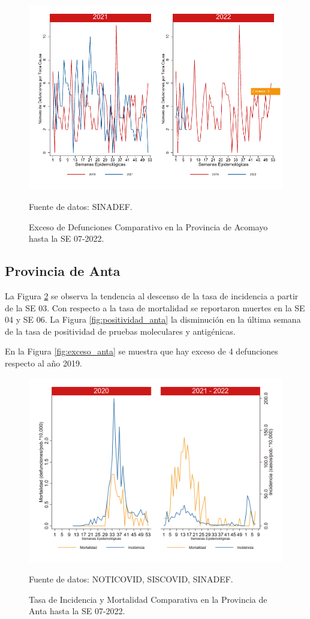 \documentclass[12pt,a4paper,openany]{book}
\begin{document}
		\begin{figure}[h]
			\caption{Exceso de Defunciones Comparativo en la Provincia de Acomayo hasta la SE 07-2022.}\label{fig:exceso_acomayo}
			\begin{center}
				\includegraphics[width=0.7\linewidth]{../figuras/exceso_1.pdf}
			\end{center}
			{\footnotesize {Fuente de datos: SINADEF.}}
		\end{figure}
		
		\clearpage
		
		\subsection*{Provincia de Anta}
		\noindent La Figura \ref{fig:inc_mort_anta} se observa la tendencia al descenso de la tasa de incidencia a partir de la SE 03. Con respecto a la tasa de mortalidad se reportaron muertes en la SE 04 y SE 06.
		\noindent La Figura
		\ref{fig:positividad_anta} la disminución en la última semana de la tasa de positividad de pruebas moleculares y antigénicas. 
		
		En la Figura \ref{fig:exceso_anta} se muestra que hay exceso de 4 defunciones respecto al año 2019.
		
		\begin{figure}[h]
			\caption{Tasa de Incidencia y Mortalidad Comparativa en la Provincia de Anta hasta la SE 07-2022.}\label{fig:inc_mort_anta}
			\begin{center}
				\includegraphics[width=0.85\linewidth]{../figuras/incidencia_mortalidad_20_21_2.png}
			\end{center}
			{\footnotesize {Fuente de datos: NOTICOVID, SISCOVID, SINADEF.}}
		\end{figure}
		
\end{document}
